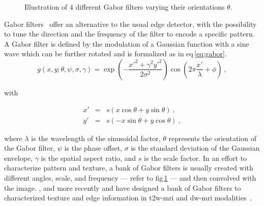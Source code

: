 \begin{figure}
	\hspace*{\fill}
		 \hfill
		 \hfill
		 \hfill
	\hspace*{\fill}
	\caption[Illustration of 4 different Gabor filters.]{Illustration of 4 different Gabor filters varying their orientations $\theta$.}
	\label{fig:gabor}
\end{figure}

Gabor filters~\cite{Gabor1946,Daugman1985} offer an alternative to the usual edge detector, with the possibility to tune the direction and the frequency of the filter to encode a specific pattern. 
A Gabor filter is defined by the modulation of a Gaussian function with a sine wave which can be further rotated and is formalized as in \acs{eq}\,\ref{eq:gabor}.
\begin{equation}
	g(x,y;\theta,\psi,\sigma,\gamma) = \exp \left( - \frac{x'^{2}+ \gamma^{2}y'^{2}}{2 \sigma^{2}} \right) \cos \left( 2 \pi \frac{x'}{\lambda} + \phi \right) \ ,
        \label{eq:gabor}
\end{equation}

\noindent with 

\begin{eqnarray}
	x' & = & s\left( x \cos \theta + y \sin \theta \right) \ , \nonumber \\
	y' & = & s \left( - x \sin \theta + y \cos \theta \right) \ , \nonumber
\end{eqnarray}

\noindent where $\lambda$ is the wavelength of the sinusoidal factor, $\theta$ represents the orientation of the Gabor filter, $\psi$ is the phase offset, $\sigma$ is the standard deviation of the Gaussian envelope, $\gamma$ is the spatial aspect ratio, and $s$ is the scale factor.
In an effort to characterize pattern and texture, a bank of Gabor filters is usually created with different angles, scale, and frequency --- refer to \acs{fig}\,\ref{fig:gabor} --- and then convolved with the image.
\citeauthor{Viswanath2012}, \citeauthor{Tiwari2012} and more recently \citeauthor{khalvati2015automated} and \citeauthor{chung2015prostate} have designed a bank of Gabor filters to characterized texture and edge information in \ac{t2w}-\ac{mri} and \ac{dw}-\ac{mri} modalities~\cite{Viswanath2012,Tiwari2012,khalvati2015automated,chung2015prostate}.

